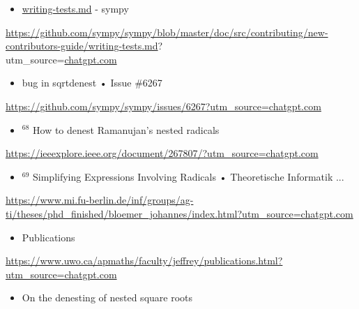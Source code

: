\documentclass[10pt]{article}
\begin{document}
\begin{itemize}
  \item[5882] \href{http://writing-tests.md}{writing-tests.md} - sympy
\end{itemize}

\href{https://github.com/sympy/sympy/blob/master/doc/src/contributing/new-contributors-guide/writing-tests.md}{https://github.com/sympy/sympy/blob/master/doc/src/contributing/new-contributors-guide/writing-tests.md}?\\
utm\_source=\href{http://chatgpt.com}{chatgpt.com}

\begin{itemize}
  \item[59] bug in sqrtdenest • Issue \#6267
\end{itemize}

\href{https://github.com/sympy/sympy/issues/6267?utm_source=chatgpt.com}{https://github.com/sympy/sympy/issues/6267?utm\_source=chatgpt.com}

\begin{itemize}
  \item[] ${ }^{68}$ How to denest Ramanujan's nested radicals
\end{itemize}

\href{https://ieeexplore.ieee.org/document/267807/?utm_source=chatgpt.com}{https://ieeexplore.ieee.org/document/267807/?utm\_source=chatgpt.com}

\begin{itemize}
  \item[] ${ }^{69}$ Simplifying Expressions Involving Radicals • Theoretische Informatik ...
\end{itemize}

\href{https://www.mi.fu-berlin.de/inf/groups/ag-ti/theses/phd_finished/bloemer_johannes/index.html?utm_source=chatgpt.com}{https://www.mi.fu-berlin.de/inf/groups/ag-ti/theses/phd\_finished/bloemer\_johannes/index.html?utm\_source=chatgpt.com}

\begin{itemize}
  \item[7193] Publications
\end{itemize}

\href{https://www.uwo.ca/apmaths/faculty/jeffrey/publications.html?utm_source=chatgpt.com}{https://www.uwo.ca/apmaths/faculty/jeffrey/publications.html?utm\_source=chatgpt.com}

\begin{itemize}
  \item[73] On the denesting of nested square roots
\end{itemize}
\end{document}
